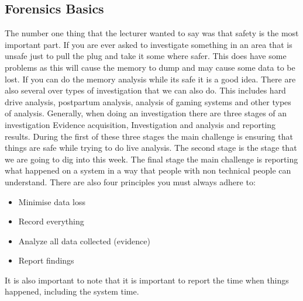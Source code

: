 \documentclass[letterpaper, onecolumn,10pt]{IEEEtran}
\begin{document}
            \subsection{Forensics Basics}
            The number one thing that the lecturer wanted to say was that safety is the most important part. If you are ever asked to investigate something in an area that is unsafe just to pull the plug and take it some where safer. This does have some problems as this will cause the memory to dump and may cause some data to be lost. If you can do the memory analysis while its safe it is a good idea. There are also several over types of investigation that we can also do. This includes hard drive analysis, postpartum analysis, analysis of gaming systems and other types of analysis. Generally, when doing an investigation there are three stages of an investigation Evidence acquisition, Investigation and analysis and reporting results. During the first of these three stages the main challenge is ensuring that things are safe while trying to do live analysis. The second stage is the stage that we are going to dig into this week. The final stage the main challenge is reporting what happened on a system in a way that people with non technical people can understand. There are also four principles you must always adhere to: 
                \begin{itemize}
                    \item Minimise data loss
                    \item Record everything
                    \item Analyze all data collected (evidence)
                    \item Report findings
                \end{itemize}
            It is also important to note that it is important to report the time when things happened, including the system time.\\
            
\end{document}
